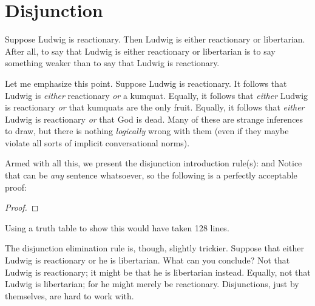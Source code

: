 \section{Disjunction}
Suppose Ludwig is reactionary. Then Ludwig is either reactionary or libertarian. After all, to say that Ludwig is either reactionary or libertarian is to say something weaker than to say that Ludwig is reactionary. 

Let me emphasize this point. Suppose Ludwig is reactionary. It follows that Ludwig is \emph{either} reactionary \emph{or} a kumquat. Equally, it follows that \emph{either} Ludwig is reactionary \emph{or} that kumquats are the only fruit.  Equally, it follows that \emph{either} Ludwig is reactionary \emph{or} that God is dead. Many of these are strange inferences to draw, but there is nothing \emph{logically} wrong with them (even if they maybe violate all sorts of implicit conversational norms).

Armed with all this, we present the disjunction introduction rule(s):
and
Notice that  can be \emph{any} sentence whatsoever, so the following is a perfectly acceptable proof:
\begin{proof}
\end{proof}
Using a truth table to show this would have taken 128 lines.

The disjunction elimination rule is, though, slightly trickier. Suppose that either Ludwig is reactionary or he is libertarian. What can you conclude? Not that Ludwig is reactionary; it might be that he is libertarian instead. Equally, not that Ludwig is libertarian; for he might merely be reactionary. Disjunctions, just by themselves, are hard to work with. 

